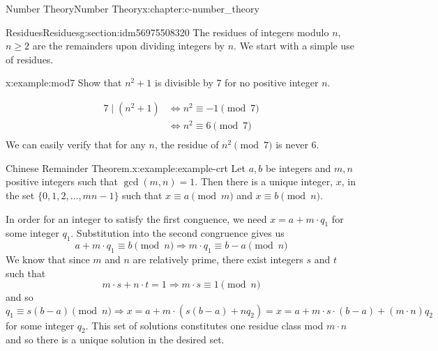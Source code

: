 \documentclass[twoside,10pt,]{book}
\numberwithin{equation}{section}
\begin{document}
\begin{chapterptx}{Number Theory}{}{Number Theory}{}{}{x:chapter:c-number_theory}
%
\begin{sectionptx}{Residues}{}{Residues}{}{}{g:section:idm56975508320}
The residues of integers modulo \(n\), \(n \geq 2\) are the remainders upon dividing integers by \(n\).  We start with a simple use of residues.%
\begin{example}{}{x:example:mod7}%
Show that \(n^2+ 1\) is divisible by 7 for no positive integer \(n\).%
\par
%
\begin{equation*}
\begin{split}
7 \mid (n^2+1) & \Leftrightarrow n^2 \equiv -1\pmod{7}\\
& \Leftrightarrow n^2 \equiv  6\pmod{7}\\
\end{split}
\end{equation*}
We can easily verify that for any \(n\), the residue of \(n^2\pmod{7}\) is never 6.%
\end{example}
\begin{example}{Chinese Remainder Theorem.}{x:example:example-crt}%
%
Let \(a, b\) be integers and \(m, n\) positive integers such that \(\gcd (m,n)=1\). Then there is a unique integer, \(x\), in the set \(\{0,1,2,\ldots , m n -1\}\) such that \(x\equiv a \pmod{m}\) and \(x\equiv b\pmod{n}\).%
\par
In order for an integer to satisfy the first conguence, we need \(x = a + m\cdot q_1\) for some integer \(q_1\).  Substitution into the second congruence gives us%
\begin{equation*}
a + m\cdot q_1\equiv b \pmod{n} \Rightarrow  m\cdot q_1\equiv b-a \pmod{n}
\end{equation*}
We know that since \(m\) and \(n\) are relatively prime, there exist integers \(s\) and \(t\) such that%
\begin{equation*}
m \cdot s + n \cdot t = 1  \Rightarrow   m \cdot s \equiv 1 \pmod{n}
\end{equation*}
and so%
\begin{equation*}
q_1\equiv s(b-a) \pmod{n}  \Rightarrow   x = a + m\cdot (s(b-a)+ n q_2)= x = a + m\cdot s\cdot(b-a)+ (m\cdot n) q_2 
\end{equation*}
for some integer \(q_2\). This set of solutions constitutes one residue class mod \(m \cdot n\) and so there is a unique solution in the desired set.%
\end{example}
\end{sectionptx}
%
%
\typeout{************************************************}

\end{chapterptx}
\end{document}
